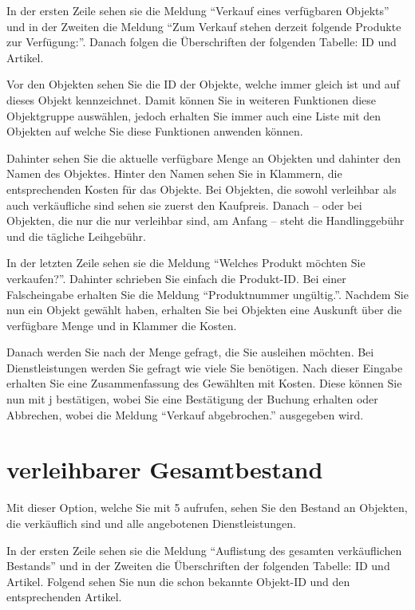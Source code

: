 ﻿\documentclass[a4paper,12pt,titlepage]{article}
\begin{document}
In der ersten Zeile sehen sie die Meldung \enquote{Verkauf eines verfügbaren Objekts}
 und in der Zweiten die Meldung \enquote{Zum Verkauf stehen derzeit folgende Produkte zur Verfügung:}.
Danach folgen die Überschriften der folgenden Tabelle: ID und Artikel.

Vor den Objekten sehen Sie die ID der Objekte, welche immer gleich ist und auf dieses Objekt kennzeichnet.
Damit können Sie in weiteren Funktionen diese Objektgruppe auswählen,
 jedoch erhalten Sie immer auch eine Liste mit den Objekten auf welche Sie diese Funktionen anwenden können.

Dahinter sehen Sie die aktuelle verfügbare Menge an Objekten und dahinter den Namen des Objektes.
Hinter den Namen sehen Sie in Klammern, die entsprechenden Kosten für das Objekte.
Bei Objekten, die sowohl verleihbar als auch verkäufliche sind sehen sie zuerst den Kaufpreis.
Danach -- oder bei Objekten, die nur die nur verleihbar sind, am Anfang --
steht die Handlinggebühr und die tägliche Leihgebühr.

In der letzten Zeile sehen sie die Meldung \enquote{Welches Produkt möchten Sie verkaufen?}.
Dahinter schrieben Sie einfach die Produkt-ID. Bei einer Falscheingabe erhalten Sie die Meldung \enquote{Produktnummer ungültig.}.
Nachdem Sie nun ein Objekt gewählt haben,
 erhalten Sie bei Objekten eine Auskunft über die verfügbare Menge und in Klammer die Kosten.

Danach werden Sie nach der Menge gefragt, die Sie ausleihen möchten.
Bei Dienstleistungen werden Sie gefragt wie viele Sie benötigen.
Nach dieser Eingabe erhalten Sie eine Zusammenfassung des Gewählten mit Kosten. 
Diese können Sie nun mit j bestätigen, wobei Sie eine Bestätigung der Buchung erhalten oder Abbrechen,
 wobei die Meldung \enquote{Verkauf abgebrochen.} ausgegeben wird.

\section{verleihbarer Gesamtbestand}
Mit dieser Option, welche Sie mit 5 aufrufen, sehen Sie den Bestand an Objekten,
 die verkäuflich sind und alle angebotenen Dienstleistungen.

In der ersten Zeile sehen sie die Meldung \enquote{Auflistung des gesamten verkäuflichen Bestands}
 und in der Zweiten die Überschriften der folgenden Tabelle: ID und Artikel.
Folgend sehen Sie nun die schon bekannte Objekt-ID und den entsprechenden Artikel.
\end{document}
